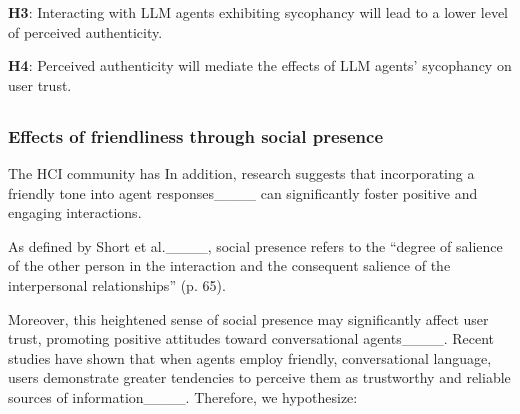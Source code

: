 \vspace{2pt}
\textbf{H3}: Interacting with LLM agents exhibiting sycophancy will lead to a lower level of perceived authenticity.

\vspace{2pt}
\textbf{H4}: Perceived authenticity will mediate the effects of LLM agents' sycophancy on user trust. 

\subsection{}
\subsubsection{Effects of friendliness through social presence}
The HCI community has  In addition, research suggests that incorporating a friendly tone into agent responses____ can significantly foster positive and engaging interactions. 

 As defined by Short et al.____, social presence refers to the ``degree of salience of the other person in the interaction and the consequent salience of the interpersonal relationships'' (p. 65). 

Moreover, this heightened sense of social presence may significantly affect user trust, promoting positive attitudes toward conversational agents____. Recent studies have shown that when agents employ friendly, conversational language, users demonstrate greater tendencies to perceive them as trustworthy and reliable sources of information____. Therefore, we hypothesize:

